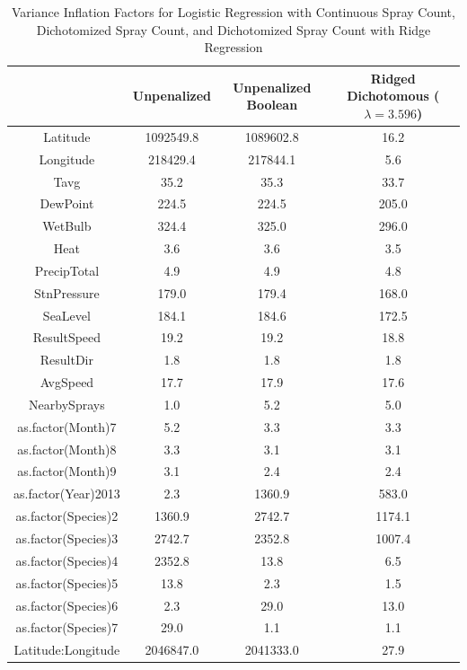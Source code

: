 \documentclass[12pt]{article}
\begin{document}
\begin{table}[H]
\centering
\begin{tabular}{|c|ccc|} \hline
 & Unpenalized & Unpenalized Boolean & Ridged Dichotomous ($\lambda=3.596$) \\ \hline
Latitude & 1092549.8 & 1089602.8 & 16.2 \\ 
  Longitude & 218429.4 & 217844.1 & 5.6 \\ 
  Tavg & 35.2 & 35.3 & 33.7 \\ 
  DewPoint & 224.5 & 224.5 & 205.0 \\ 
  WetBulb & 324.4 & 325.0 & 296.0 \\ 
  Heat & 3.6 & 3.6 & 3.5 \\ 
  PrecipTotal & 4.9 & 4.9 & 4.8 \\ 
  StnPressure & 179.0 & 179.4 & 168.0 \\ 
  SeaLevel & 184.1 & 184.6 & 172.5 \\ 
  ResultSpeed & 19.2 & 19.2 & 18.8 \\ 
  ResultDir & 1.8 & 1.8 & 1.8 \\ 
  AvgSpeed & 17.7 & 17.9 & 17.6 \\ 
  NearbySprays & 1.0 & 5.2 & 5.0 \\ 
  as.factor(Month)7 & 5.2 & 3.3 & 3.3 \\ 
  as.factor(Month)8 & 3.3 & 3.1 & 3.1 \\ 
  as.factor(Month)9 & 3.1 & 2.4 & 2.4 \\ 
  as.factor(Year)2013 & 2.3 & 1360.9 & 583.0 \\ 
  as.factor(Species)2 & 1360.9 & 2742.7 & 1174.1 \\ 
  as.factor(Species)3 & 2742.7 & 2352.8 & 1007.4 \\ 
  as.factor(Species)4 & 2352.8 & 13.8 & 6.5 \\ 
  as.factor(Species)5 & 13.8 & 2.3 & 1.5 \\ 
  as.factor(Species)6 & 2.3 & 29.0 & 13.0 \\ 
  as.factor(Species)7 & 29.0 & 1.1 & 1.1 \\ 
  Latitude:Longitude & 2046847.0 & 2041333.0 & 27.9 \\ \hline
\end{tabular}
\caption*{Variance Inflation Factors for Logistic Regression with Continuous Spray Count, Dichotomized Spray Count, and Dichotomized Spray Count with Ridge Regression}
\end{table}
\end{document}
